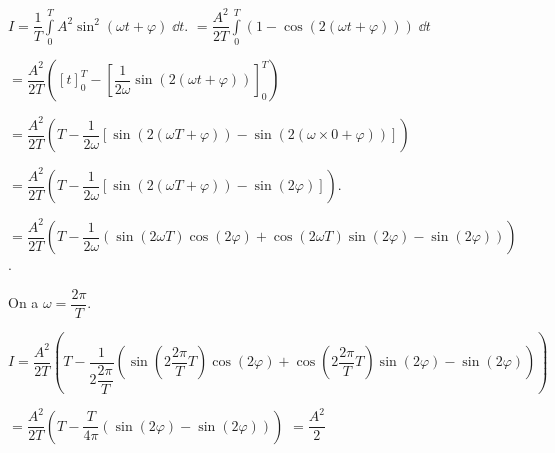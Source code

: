 $I = \dfrac{1}{T} \int\limits_{0}^{T} A^2 \sin^2(\omega t + \varphi)\; \dd t.$
$= \dfrac{ A^2}{2 T} \int\limits_{0}^{T} \left( 1 - \cos\left( 2\left(\omega t + \varphi\right)\right)\right)\; \dd t$


$= {\dfrac{ A^2}{2 T}\left( \left[t\right]_{0}^{T} -  \left[\dfrac{1}{2\omega}\sin\left( 2\left(\omega t + \varphi\right)\right)\right]_{0}^{T}  \right)}$

$= {\dfrac{ A^2}{2 T}\left( T -  \dfrac{1}{2\omega}\left[
\sin\left( 2\left(\omega T + \varphi\right)\right)
- \sin\left( 2\left(\omega \times 0 + \varphi\right)\right)\right]  \right)}$

$= {\dfrac{ A^2}{2 T}\left( T -  \dfrac{1}{2\omega}\left[
\sin\left( 2\left(\omega T + \varphi\right)\right)
- \sin\left( 2 \varphi\right)\right]  \right)}$. 

$= {\dfrac{ A^2}{2 T}\left( T -  \dfrac{1}{2\omega}\left(
\sin\left( 2\omega T \right)\cos\left( 2\varphi\right)
+\cos\left( 2\omega T \right)\sin\left( 2\varphi\right)
- \sin\left( 2 \varphi\right)\right)  \right)}$. 

On a $\omega = \dfrac{2\pi}{T}$.

$I= {\dfrac{ A^2}{2 T}\left( T -  \dfrac{1}{2\dfrac{2\pi}{T}}\left(
\sin\left( 2\dfrac{2\pi}{T} T \right)\cos\left( 2\varphi\right)
+\cos\left( 2\dfrac{2\pi}{T} T \right)\sin\left( 2\varphi\right)
- \sin\left( 2 \varphi\right)\right)  \right)}$ 

$ = \dfrac{ A^2}{2 T}\left( T -  \dfrac{T}{4\pi}\left(
\sin\left( 2\varphi\right) - \sin\left( 2 \varphi\right)\right)  \right) $
$ =\dfrac{A^2}{2}$





%
%
%
%
%

